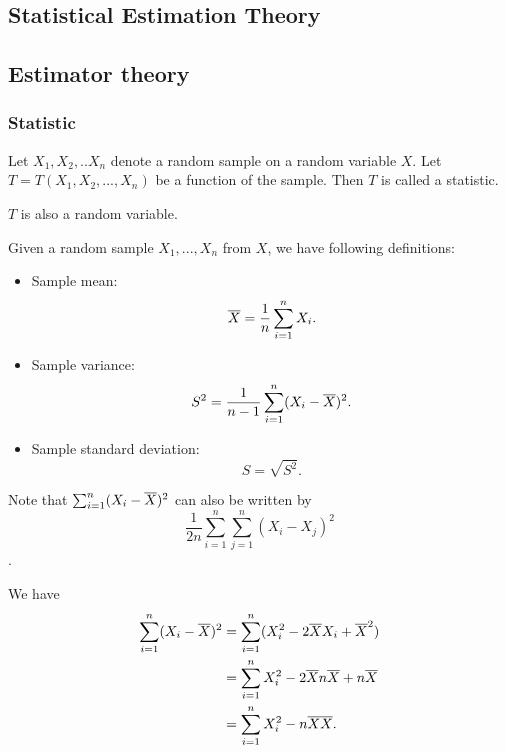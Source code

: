 \begin{refsection}
	\startcontents[chapters]

\chapter{Statistical Estimation Theory}
\section{Estimator theory}

\subsection{Statistic}

\begin{definition}[statistic]
Let $X_1,X_2,..X_n$ denote a random sample on a random variable $X$. Let 
$T=T(X_1,X_2,...,X_n)$ be a function of the sample. Then $T$ is called a statistic.
\end{definition}

\begin{remark}
$T$ is also a random variable.
\end{remark}

\begin{definition}\hfill
Given a random sample $X_1,...,X_n$ from $X$, we have following definitions:
\begin{itemize}
	\item Sample mean:
	$$\overline{X} = \frac{1}{n}\sum_{i=1}^n X_i.$$
	\item Sample variance:
	$$S^2 = \frac{1}{n-1}\sum_{i=1}^n (X_i - \overline{X})^2.$$
	\item Sample standard deviation:
	$$S = \sqrt{S^2}.$$
\end{itemize}
\end{definition}

\begin{remark}
Note that $\sum_{i=1}^n (X_i - \overline{X})^2$ can also be written by $$\frac{1}{2n}\sum_{i=1}^n\sum_{j=1}^n (X_i - X_j)^2$$.

We have
\begin{align*}
\sum_{i=1}^n (X_i - \overline{X})^2 &= \sum_{i=1}^n (X_i^2 - 2\overline{X}X_i + \overline{X}^2) \\
								&= \sum_{i=1}^n X_i^2 - 2\overline{X}n\overline{X} + n\overline{X} \\
								&= \sum_{i=1}^n X_i^2 - n\overline{X}\overline{X}.
\end{align*}



\end{remark}
\end{refsection}

